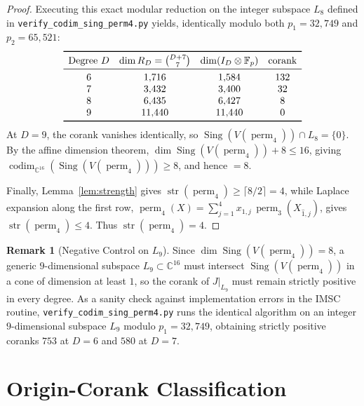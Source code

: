 \documentclass[11pt,a4paper]{article}
\theoremstyle{definition}
\newtheorem{remark}[theorem]{Remark}
\DeclareMathOperator{\perm}{perm}
\DeclareMathOperator{\codim}{codim}
\DeclareMathOperator{\Sing}{Sing}
\DeclareMathOperator{\str}{str}
\begin{document}
\begin{proof}
Executing this exact modular reduction on the integer subspace $L_8$ defined in \texttt{verify\_codim\_sing\_perm4.py} yields, identically modulo both $p_1 = 32{,}749$ and $p_2 = 65{,}521$:
\[
\begin{array}{cccc}
\toprule
\text{Degree } D & \dim R_D = \binom{D+7}{7} & \dim(I_D \otimes \mathbb{F}_p) & \text{corank} \\
\midrule
6 & 1{,}716 & 1{,}584 & 132 \\
7 & 3{,}432 & 3{,}400 & 32 \\
8 & 6{,}435 & 6{,}427 & 8 \\
9 & 11{,}440 & 11{,}440 & 0 \\
\bottomrule
\end{array}
\]
At $D = 9$, the corank vanishes identically, so $\Sing(V(\perm_4)) \cap L_8 = \{0\}$. By the affine dimension theorem, $\dim \Sing(V(\perm_4)) + 8 \le 16$, giving $\codim_{\mathbb{C}^{16}}(\Sing(V(\perm_4))) \ge 8$, and hence $= 8$.

Finally, Lemma~\ref{lem:strength} gives $\str(\perm_4) \ge \lceil 8/2 \rceil = 4$, while Laplace expansion along the first row, $\perm_4(X) = \sum_{j=1}^4 x_{1,j}\,\perm_3(X_{\hat{1},\hat{j}})$, gives $\str(\perm_4) \le 4$. Thus $\str(\perm_4) = 4$.
\end{proof}

\begin{remark}[Negative Control on $L_9$]
Since $\dim \Sing(V(\perm_4)) = 8$, a generic $9$-dimensional subspace $L_9 \subset \mathbb{C}^{16}$ must intersect $\Sing(V(\perm_4))$ in a cone of dimension at least $1$, so the corank of $J|_{L_9}$ must remain strictly positive in every degree. As a sanity check against implementation errors in the IMSC routine, \texttt{verify\_codim\_sing\_perm4.py} runs the identical algorithm on an integer $9$-dimensional subspace $L_9$ modulo $p_1 = 32{,}749$, obtaining strictly positive coranks $753$ at $D = 6$ and $580$ at $D = 7$.
\end{remark}

\section{Origin-Corank Classification}\label{sec:corank}
\end{document}
